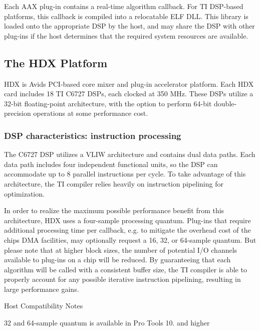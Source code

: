 Each A\+AX plug-\/in contains a real-\/time algorithm callback. For TI D\+S\+P-\/based platforms, this callback is compiled into a relocatable E\+LF D\+LL. This library is loaded onto the appropriate D\+SP by the host, and may share the D\+SP with other plug-\/ins if the host determines that the required system resources are available. 

 \hypertarget{a00832_aax_ti_guide_01_the_hdx_platform}{}\subsection{The H\+D\+X Platform}\label{a00832_aax_ti_guide_01_the_hdx_platform}
H\+DX is Avid\textquotesingle{}s P\+C\+I-\/based core mixer and plug-\/in accelerator platform. Each H\+DX card includes 18 TI C6727 D\+S\+Ps, each clocked at 350 M\+Hz. These D\+S\+Ps utilize a 32-\/bit floating-\/point architecture, with the option to perform 64-\/bit double-\/precision operations at some performance cost.

\hypertarget{a00832_subsection__dsp_characteristics_instruction_processing}{}\subsubsection{D\+S\+P characteristics\+: instruction processing}\label{a00832_subsection__dsp_characteristics_instruction_processing}
 The C6727 D\+SP utilizes a V\+L\+IW architecture and contains dual data paths. Each data path includes four independent functional units, so the D\+SP can accommodate up to 8 parallel instructions per cycle. To take advantage of this architecture, the TI compiler relies heavily on instruction pipelining for optimization.

In order to realize the maximum possible performance benefit from this architecture, H\+DX uses a four-\/sample processing quantum. Plug-\/ins that require additional processing time per callback, e.\+g. to mitigate the overhead cost of the chip\textquotesingle{}s D\+MA facilities, may optionally request a 16, 32, or 64-\/sample quantum. But please note that at higher block sizes, the number of potential I/O channels available to plug-\/ins on a chip will be reduced. By guaranteeing that each algorithm will be called with a consistent buffer size, the TI compiler is able to properly account for any possible iterative instruction pipelining, resulting in large performance gains.

 \begin{DoxyRefDesc}{Host Compatibility Notes}
\item[\mbox{\hyperlink{a00786__compatibility_notes000022}{Host Compatibility Notes}}]32 and 64-\/sample quantum is available in Pro Tools 10. and higher\end{DoxyRefDesc}


